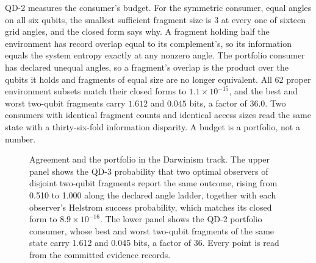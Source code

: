 \documentclass[aps,pre,reprint,nofootinbib,floatfix]{revtex4-2}
\begin{document}
QD-2 measures the consumer's budget.  For the symmetric consumer,
equal angles on all six qubits, the smallest sufficient fragment
size is 3 at every one of sixteen grid angles, and the closed form
says why.  A fragment holding half the environment has record
overlap equal to its complement's, so its information equals the
system entropy exactly at any nonzero angle.  The portfolio
consumer has declared unequal angles, so a fragment's overlap is
the product over the qubits it holds and fragments of equal size
are no longer equivalent.  All 62 proper environment subsets match
their closed forms to $1.1\times10^{-15}$, and the best and worst
two-qubit fragments carry $1.612$ and $0.045$ bits, a factor of
$36.0$.  Two consumers with identical fragment counts and
identical access sizes read the same state with a thirty-six-fold
information disparity.  A budget is a portfolio, not a number.

\begin{figure}[t]
\centering
{}
\caption{Agreement and the portfolio in the Darwinism track.  The
upper panel shows the QD-3 probability that two optimal observers
of disjoint two-qubit fragments report the same outcome, rising
from 0.510 to 1.000 along the declared angle ladder, together with
each observer's Helstrom success probability, which matches its
closed form to $8.9\times10^{-16}$.  The lower panel shows the
QD-2 portfolio consumer, whose best and worst two-qubit fragments
of the same state carry 1.612 and 0.045 bits, a factor of 36.
Every point is read from the committed evidence records.}
\label{fig:qd}
\end{figure}
\end{document}

